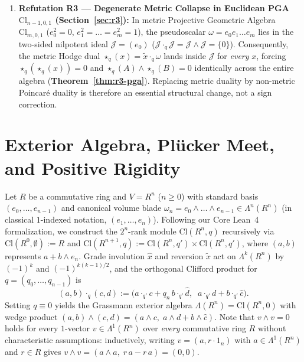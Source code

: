 \documentclass[11pt]{article}
\theoremstyle{definition}
\newcommand{\Cl}{\mathrm{Cl}}
\begin{document}
\begin{enumerate}
  \item \textbf{Refutation R3 --- Degenerate Metric Collapse in Euclidean PGA $\Cl_{n-1,0,1}$ (Section~\ref{sec:r3}):} In metric Projective Geometric Algebra $\Cl_{m,0,1}$ ($e_0^2 = 0$, $e_1^2 = \dots = e_m^2 = 1$), the pseudoscalar $\omega = e_0 e_1 \dots e_m$ lies in the two-sided nilpotent ideal $\mathcal{J} = (e_0)$ ($\mathcal{J}\cdot_q \mathcal{J} = \mathcal{J}\wedge\mathcal{J} = \{0\}$). Consequently, the metric Hodge dual $\star_q(x) = \widetilde{x}\cdot_q\omega$ lands inside $\mathcal{J}$ for \emph{every} $x$, forcing $\star_q(\star_q(x)) = 0$ and $\star_q(A) \wedge \star_q(B) = 0$ identically across the entire algebra (\textbf{Theorem~\ref{thm:r3-pga}}). Replacing metric duality by non-metric Poincar\'e duality is therefore an essential structural change, not a sign correction.
\end{enumerate}

\section{Exterior Algebra, Pl\"ucker Meet, and Positive Rigidity}\label{sec:positive}

Let $R$ be a commutative ring and $V = R^n$ ($n \ge 0$) with standard basis $(e_0, \dots, e_{n-1})$ and canonical volume blade $\omega_n = e_0 \wedge \dots \wedge e_{n-1} \in \Lambda^n(R^n)$ (in classical $1$-indexed notation, $(e_1, \dots, e_n)$). Following our Core Lean~4 formalization, we construct the $2^n$-rank module $\Cl(R^n, q)$ recursively via $\Cl(R^0, \emptyset) := R$ and $\Cl(R^{n+1}, q) := \Cl(R^n, q') \times \Cl(R^n, q')$, where $(a,b)$ represents $a + b \wedge e_n$. Grade involution $\hat{x}$ and reversion $\widetilde{x}$ act on $\Lambda^k(R^n)$ by $(-1)^k$ and $(-1)^{k(k-1)/2}$, and the orthogonal Clifford product for $q = (q_0, \dots, q_{n-1})$ is
\begin{equation}\label{eq:clifford-def}
  (a, b)\cdot_q (c, d) := \bigl(a\cdot_{q'} c + q_n\, b\cdot_{q'}\hat{d},\;\; a\cdot_{q'} d + b\cdot_{q'}\hat{c}\bigr).
\end{equation}
Setting $q \equiv 0$ yields the Grassmann exterior algebra $\Lambda(R^n) = \Cl(R^n, 0)$ with wedge product $(a,b) \wedge (c,d) = (a \wedge c,\; a \wedge d + b \wedge \hat{c})$. Note that $v \wedge v = 0$ holds for every $1$-vector $v \in \Lambda^1(R^n)$ over \emph{every} commutative ring $R$ without characteristic assumptions: inductively, writing $v = (a, r\cdot 1_n)$ with $a \in \Lambda^1(R^n)$ and $r \in R$ gives $v \wedge v = (a \wedge a,\; r\,a - r\,a) = (0,0)$.
\end{document}
